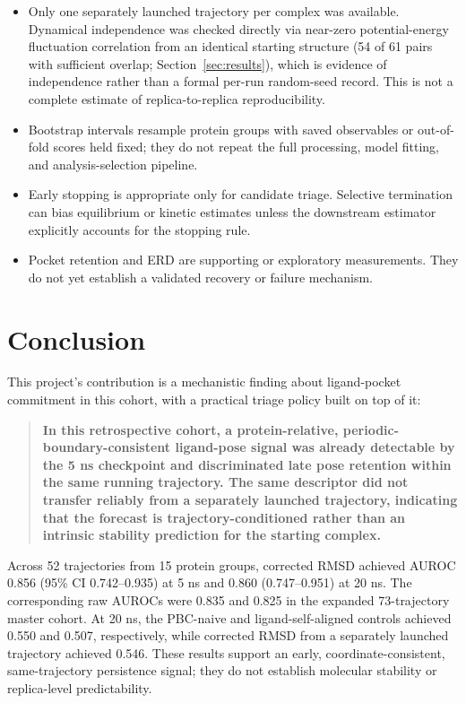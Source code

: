 \documentclass[11pt]{article}
\begin{document}
\begin{itemize}
    \item Only one separately launched trajectory per complex was available. Dynamical independence was checked directly via near-zero potential-energy fluctuation correlation from an identical starting structure (54 of 61 pairs with sufficient overlap; Section~\ref{sec:results}), which is evidence of independence rather than a formal per-run random-seed record. This is not a complete estimate of replica-to-replica reproducibility.
    \item Bootstrap intervals resample protein groups with saved observables or out-of-fold scores held fixed; they do not repeat the full processing, model fitting, and analysis-selection pipeline.
    \item Early stopping is appropriate only for candidate triage. Selective termination can bias equilibrium or kinetic estimates unless the downstream estimator explicitly accounts for the stopping rule.
    \item Pocket retention and ERD are supporting or exploratory measurements. They do not yet establish a validated recovery or failure mechanism.
\end{itemize}

\section{Conclusion}

This project's contribution is a mechanistic finding about ligand-pocket commitment in this cohort, with a practical triage policy built on top of it:

\begin{quote}
\textbf{In this retrospective cohort, a protein-relative, periodic-boundary-consistent ligand-pose signal was already detectable by the 5 ns checkpoint and discriminated late pose retention within the same running trajectory. The same descriptor did not transfer reliably from a separately launched trajectory, indicating that the forecast is trajectory-conditioned rather than an intrinsic stability prediction for the starting complex.}
\end{quote}

Across 52 trajectories from 15 protein groups, corrected RMSD achieved AUROC 0.856 (95\% CI 0.742--0.935) at 5 ns and 0.860 (0.747--0.951) at 20 ns. The corresponding raw AUROCs were 0.835 and 0.825 in the expanded 73-trajectory master cohort. At 20 ns, the PBC-naive and ligand-self-aligned controls achieved 0.550 and 0.507, respectively, while corrected RMSD from a separately launched trajectory achieved 0.546. These results support an early, coordinate-consistent, same-trajectory persistence signal; they do not establish molecular stability or replica-level predictability.
\end{document}
